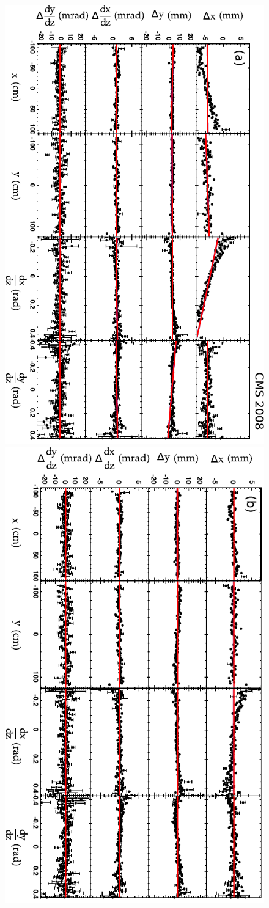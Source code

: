 \begin{figure}
\begin{center}
\includegraphics[height=\linewidth, angle=90]{plots/gma_hip_algorithm/exampleData_wh0st1sec10_polybefore.pdf}

\includegraphics[height=\linewidth, angle=90]{plots/gma_hip_algorithm/exampleData_wh0st1sec10_polyafter.pdf}
\end{center}


\end{figure}
